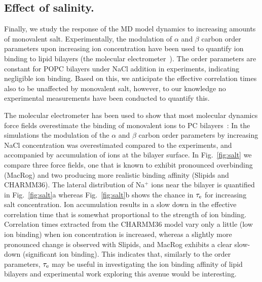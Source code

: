 \documentclass[journal=jpcbfk,manuscript=article,layout=twocolumn]{achemso}
\begin{document}
\subsection*{Effect of salinity.}
Finally, we study the response of the MD model dynamics to increasing amounts of monovalent salt. Experimentally, the modulation of $\alpha$ and $\beta$ carbon order parameters upon increasing ion concentration have been used to quantify ion binding to lipid bilayers (the molecular electrometer~\cite{seeling87,catte16}). The order parameters are constant for POPC bilayers under NaCl addition in experiments, indicating negligible ion binding. Based on this, we anticipate the effective correlation times also to be unaffected by monovalent salt, however, to our knowledge no experimental measurements have been conducted to quantify this.

The molecular electrometer has been used to show that most molecular dynamics force fields overestimate the binding of monovalent ions to PC bilayers~\cite{catte16}: In the simulations the modulation of the $\alpha$ and $\beta$ carbon order parameters by increasing NaCl concentration was overestimated compared to the experiments, and accompanied by accumulation of ions at the bilayer surface. In Fig.~\ref{fig:salt} we compare three force fields, one that is known to exhibit pronounced overbinding~\cite{catte16} (MacRog) and two producing more realistic binding affinity (Slipids and CHARMM36). The lateral distribution of Na$^{+}$ ions near the bilayer is quantified in Fig.~\ref{fig:salt}a whereas Fig.~\ref{fig:salt}b shows the chance in $\tau_{\rm{e}}$ for increasing salt concentration. Ion accumulation results in a slow down in the effective correlation time that is somewhat proportional to the strength of ion binding. Correlation times extracted from the CHARMM36 model vary only a little (low ion binding) when ion concentration is increased, whereas a slightly more pronounced change is observed with Slipids, and MacRog exhibits a clear slow-down (significant ion binding). This indicates that, similarly to the order parameters, $\tau_{\rm{e}}$ may be useful in investigating the ion binding affinity of lipid bilayers and experimental work exploring this avenue would be interesting.   

\end{document}
